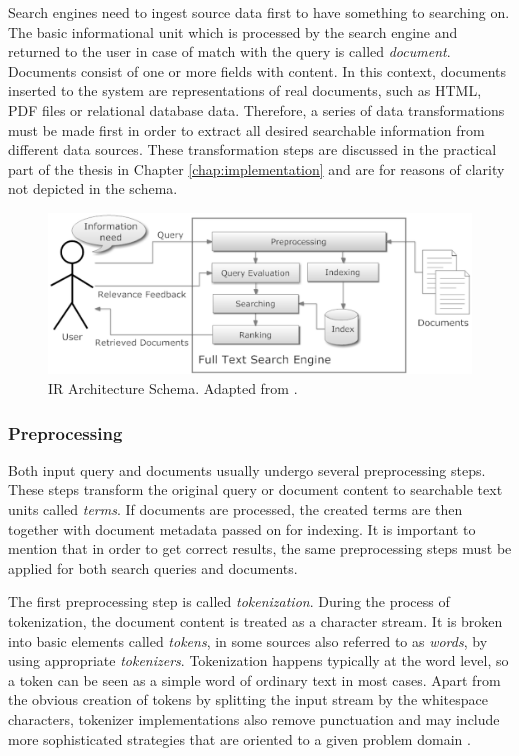 Search engines need to ingest source data first to have something to searching on. 
The basic informational unit which is processed by the search engine and returned to the user in case of match with the query is called \textsl{document}. 
Documents consist of one or more fields with content.
In this context, documents inserted to the system are representations of real documents, such as HTML, PDF files or relational database data.
Therefore, a series of data transformations must be made first in order to extract all desired searchable information from different data sources. 
These transformation steps are discussed in the practical part of the thesis in Chapter \ref{chap:implementation} and are for reasons of clarity not depicted in the schema. 
  
\begin{figure}[h]
	\centering
		\includegraphics[width=1.00\textwidth]{figures/fulltext_schema.eps}
	\caption{IR Architecture Schema. Adapted from \cite{IR:ImplemEvalSearchEng,MiddletonBaeza}.}
	\label{fig:fulltext_schema}
\end{figure}

\subsubsection{Preprocessing}

Both input query and documents usually undergo several preprocessing steps.
These steps transform the original query or document content to searchable text units called \textit{terms}.
If documents are processed, the created terms are then together with document metadata passed on for indexing.
It is important to mention that in order to get correct results, the same preprocessing steps must be applied for both search queries and documents.

The first preprocessing step is called \textit{tokenization}.
During the process of tokenization, the document content is treated as a character stream.
It is broken into basic elements called \textit{tokens}, in some sources also referred to as \textsl{words}, by using appropriate \textit{tokenizers}.
Tokenization happens typically at the word level, so a token can be seen as a simple word of ordinary text in most cases.
Apart from the obvious creation of tokens by splitting the input stream by the whitespace characters, tokenizer implementations also remove punctuation and may include more sophisticated strategies that are oriented to a given problem domain \cite{ManningRaghavanSchuetze08}.

